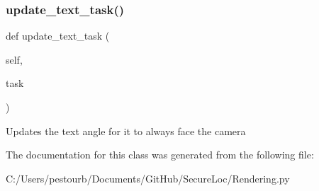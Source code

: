 \subsubsection{\texorpdfstring{update\+\_\+text\+\_\+task()}{update\_text\_task()}}
{\footnotesize\ttfamily def update\+\_\+text\+\_\+task (\begin{DoxyParamCaption}\item[{}]{self,  }\item[{}]{task }\end{DoxyParamCaption})}

\begin{DoxyVerb}Updates the text angle for it to always face the camera\end{DoxyVerb}
 

The documentation for this class was generated from the following file\+:\begin{DoxyCompactItemize}
\item 
C\+:/\+Users/pestourb/\+Documents/\+Git\+Hub/\+Secure\+Loc/Rendering.\+py\end{DoxyCompactItemize}
